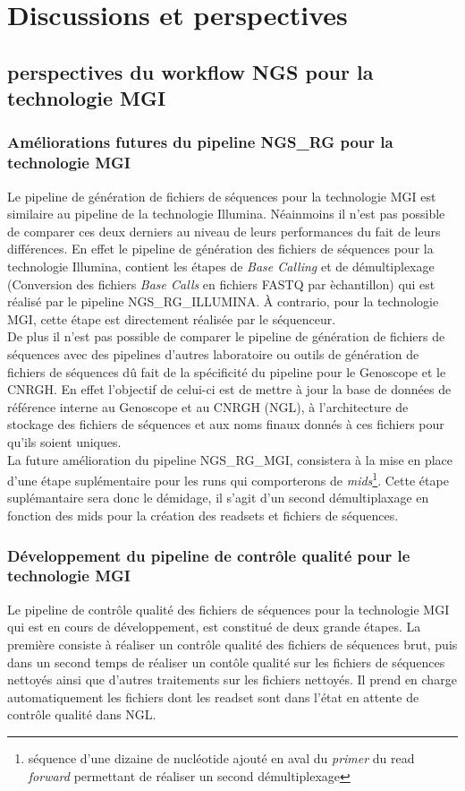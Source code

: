 \section{Discussions et perspectives}
\subsection{ perspectives du workflow NGS pour la technologie MGI}

\subsubsection{Améliorations futures du pipeline NGS\_RG pour la technologie MGI}
Le pipeline de génération de fichiers de séquences pour la technologie MGI est similaire au pipeline de la technologie Illumina. Néainmoins il n'est pas possible de comparer ces deux derniers au niveau de leurs performances du fait de leurs différences. En effet le pipeline de génération des fichiers de séquences pour la technologie Illumina, contient les étapes de \emph{Base Calling} et de démultiplexage (Conversion des fichiers \emph{Base Calls} en fichiers FASTQ par èchantillon) qui est réalisé par le pipeline NGS\_RG\_ILLUMINA. À contrario, pour la technologie MGI, cette étape est directement réalisée par le séquenceur.\\
De plus il n'est pas possible de comparer le pipeline de génération de fichiers de séquences avec des pipelines d'autres laboratoire ou outils de génération de fichiers de séquences dû fait de la spécificité du pipeline pour le Genoscope et le CNRGH. En effet l'objectif de celui-ci est de mettre à jour la base de données de référence interne au Genoscope et au CNRGH (NGL), à l'architecture de stockage des fichiers de séquences et aux noms finaux donnés à ces fichiers pour qu'ils soient uniques.\\

La future amélioration du pipeline NGS\_RG\_MGI, consistera à la mise en place d'une étape suplémentaire pour les runs qui comporterons de \emph{mids}\footnote{séquence d'une dizaine de nucléotide ajouté en aval du \emph{primer} du read \emph{forward} permettant de réaliser un second démultiplexage}. Cette étape suplémantaire sera donc le démidage, il s'agit d'un second démultiplaxage en fonction des mids pour la création des readsets et fichiers de séquences.


\subsubsection{Développement du pipeline de contrôle qualité pour le technologie MGI}
Le pipeline de contrôle qualité des fichiers de séquences pour la technologie MGI qui est en cours de développement, est constitué de deux grande étapes. La première consiste à réaliser un contrôle qualité des fichiers de séquences brut, puis dans un second temps de réaliser un contôle qualité sur les fichiers de séquences nettoyés ainsi que d'autres traitements sur les fichiers nettoyés. Il prend en charge automatiquement les fichiers dont les readset sont dans l'état \og en attente de contrôle qualité\fg{} dans NGL.\\


